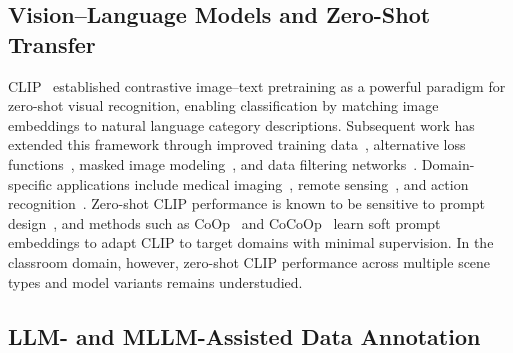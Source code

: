 \documentclass[10pt,letterpaper]{article}
\begin{document}
\subsection*{Vision--Language Models and Zero-Shot Transfer}

CLIP~\cite{radford2021learning} established contrastive
image--text pretraining as a powerful paradigm for zero-shot visual
recognition, enabling classification by matching image embeddings to
natural language category descriptions.
Subsequent work has extended this framework through improved training
data~\cite{schuhmann2022laion5b,cherti2023reproducible}, alternative
loss functions~\cite{zhai2023sigmoid}, masked image
modeling~\cite{sun2023eva02}, and data filtering
networks~\cite{fang2023data}.
Domain-specific applications include medical
imaging~\cite{wang2022medclip}, remote sensing~\cite{liu2024remoteclip},
and action recognition~\cite{wang2021actionclip}.
Zero-shot CLIP performance is known to be sensitive to prompt
design~\cite{radford2021learning}, and methods such as
CoOp~\cite{zhou2022learning} and CoCoOp~\cite{zhou2022conditional}
learn soft prompt embeddings to adapt CLIP to target domains with
minimal supervision.
In the classroom domain, however, zero-shot CLIP performance across
multiple scene types and model variants remains understudied.

\subsection*{LLM- and MLLM-Assisted Data Annotation}
\end{document}
